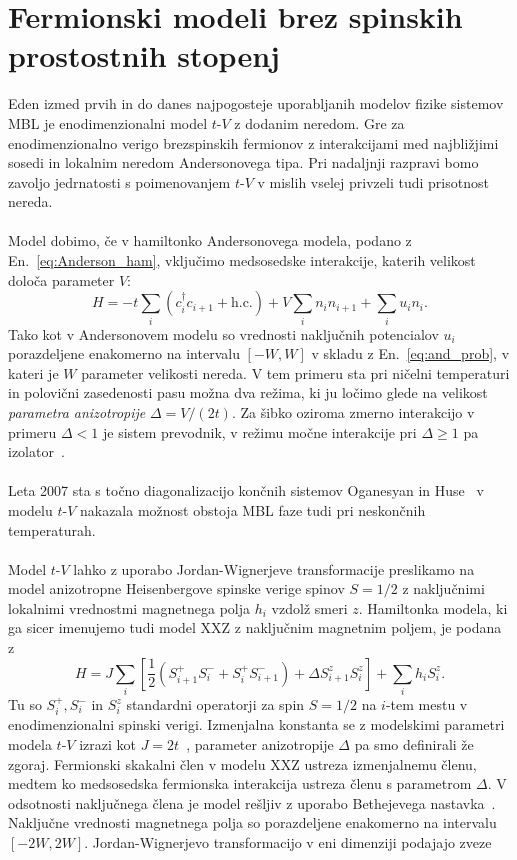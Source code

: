 \section{Fermionski modeli brez spinskih prostostnih stopenj}
\label{Heis_spinless}
Eden izmed prvih in do danes najpogosteje uporabljanih modelov fizike sistemov MBL je enodimenzionalni model $t$-$V$ z dodanim neredom. Gre za enodimenzionalno verigo brezspinskih fermionov z interakcijami med najbližjimi sosedi in lokalnim neredom Andersonovega tipa. Pri nadaljnji razpravi bomo zavoljo jedrnatosti s poimenovanjem $t$-$V$ v mislih vselej privzeli tudi prisotnost nereda. \\\\Model dobimo, če v hamiltonko Andersonovega modela, podano z En.~\eqref{eq:Anderson_ham}, vključimo medsosedske interakcije, katerih velikost določa parameter $V$:
\begin{equation}\label{eq:tV}
H=-t\sum\limits_i\left(c^\dagger_i c_{i+1} + \mathrm{h.c.}\right) + V\sum\limits_i n_in_{i+1} + \sum\limits_i u_in_i.
\end{equation} 
Tako kot v Andersonovem modelu so vrednosti naključnih potencialov $u_i$ porazdeljene enakomerno na intervalu $[-W,W]$ v skladu z En.~\eqref{eq:and_prob}, v kateri je $W$ parameter velikosti nereda. V tem primeru sta pri ničelni temperaturi in polovični zasedenosti pasu možna  dva režima, ki ju ločimo glede na velikost \emph{parametra anizotropije } $\Delta=V/(2t)$.  Za šibko oziroma zmerno interakcijo v primeru $\Delta<1$ je sistem prevodnik, v režimu močne interakcije pri $\Delta\geq 1$ pa izolator~\cite{prelovvsek2017density}. \\\\
Leta 2007 sta s točno diagonalizacijo končnih sistemov Oganesyan in Huse~\cite{PhysRevB.75.155111} v modelu $t$-$V$  nakazala možnost obstoja MBL faze tudi pri neskončnih temperaturah. \\\\
Model $t$-$V$ lahko z uporabo Jordan-Wignerjeve transformacije preslikamo na model anizotropne Heisenbergove spinske verige spinov $S=1/2$  z naključnimi lokalnimi vrednostmi magnetnega polja $h_i$ vzdolž smeri $z$. Hamiltonka modela, ki ga sicer imenujemo tudi model XXZ z naključnim magnetnim poljem, je podana z 
\begin{equation}\label{eq:XXZ}
H=J\sum\limits_i\left[\frac{1}{2}\left(S_{i+1}^+S_i^- + S_i^+S_{i+1}^-\right) + \Delta S_{i+1}^zS_i^z\right] + \sum\limits_i h_i S_i^z.
\end{equation}
Tu so $S_i^+, S_i^-$ in $S_i^z$ standardni operatorji za spin $S=1/2$ na $i$-tem mestu v enodimenzionalni spinski verigi. Izmenjalna konstanta se z modelskimi parametri modela $t$-$V$ izrazi kot $J=2t$~\cite{prelovvsek2017density}, parameter anizotropije $\Delta$ pa smo definirali že zgoraj. Fermionski skakalni člen v modelu XXZ ustreza izmenjalnemu členu, medtem ko medsosedska fermionska interakcija ustreza členu s parametrom $\Delta$. V odsotnosti naključnega člena je model rešljiv z uporabo Bethejevega nastavka~\cite{karabach1997introduction}. Naključne vrednosti magnetnega polja so porazdeljene enakomerno na intervalu $[-2W,2W]$.  Jordan-Wignerjevo transformacijo v eni dimenziji podajajo zveze
